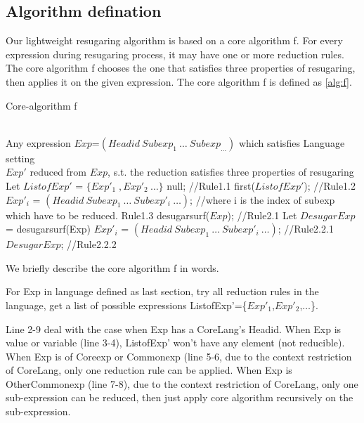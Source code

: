 \subsection{Algorithm defination}

Our lightweight resugaring algorithm is based on a core algorithm f. For every expression during resugaring process, it may have one or more reduction rules. The core algorithm f chooses the one that satisfies three properties of resugaring, then applies it on the given expression. The core algorithm f is defined as \ref{alg:f}.
\begin{algorithm}
	\caption{Core-algorithm f}
	\label{alg:f}     %
	\begin{algorithmic}[1]       %
		\REQUIRE ~~\\      %
		Any expression $Exp$=$(Headid~Subexp_{1}~\ldots~Subexp_{\ldots})$ which satisfies Language setting
		\ENSURE ~~\\     %
		$Exp'$ reduced from $Exp$, s.t. the reduction satisfies three properties of resugaring
		\STATE     Let $ListofExp'$ = $\{Exp'_{1}\;,Exp'_{2}~\ldots\}$
		\RETURN null; //\hfill Rule1.1
		\RETURN first($ListofExp'$); //\hfill Rule1.2
		\ELSE 
		\RETURN $Exp'_{i}$ = $(Headid~Subexp_{1}~\ldots~Subexp'_{i}~\ldots)$; //where i is the index of subexp which have to be reduced. \hfill Rule1.3
		\ENDIF
		\ELSE 
		\RETURN desugarsurf($Exp$); //\hfill Rule2.1
		\ELSE
		\STATE Let $DesugarExp$ = desugarsurf(Exp)
		\RETURN $Exp'_{i}$ = $(Headid~Subexp_{1}~\ldots~Subexp'_{i}~\ldots)$; //\hfill Rule2.2.1
		\ELSE
		\RETURN $DesugarExp$; //\hfill Rule2.2.2
		\ENDIF
		\ENDIF
		\ENDIF
		
	\end{algorithmic}
\end{algorithm}

We briefly describe the core algorithm f in words.

For Exp in language defined as last section, try all reduction rules in the language, get a list of possible expressions ListofExp'=\{$Exp'_{1}$,$Exp'_{2}$,$\ldots$\}. 

Line 2-9 deal with the case when Exp has a CoreLang's Headid. When Exp is value or variable (line 3-4), ListofExp' won't have any element (not reducible). When Exp is of Coreexp or Commonexp (line 5-6, due to the context restriction of CoreLang, only one reduction rule can be applied. When Exp is OtherCommonexp (line 7-8), due to the context restriction of CoreLang, only one sub-expression can be reduced, then just apply core algorithm recursively on the sub-expression.

